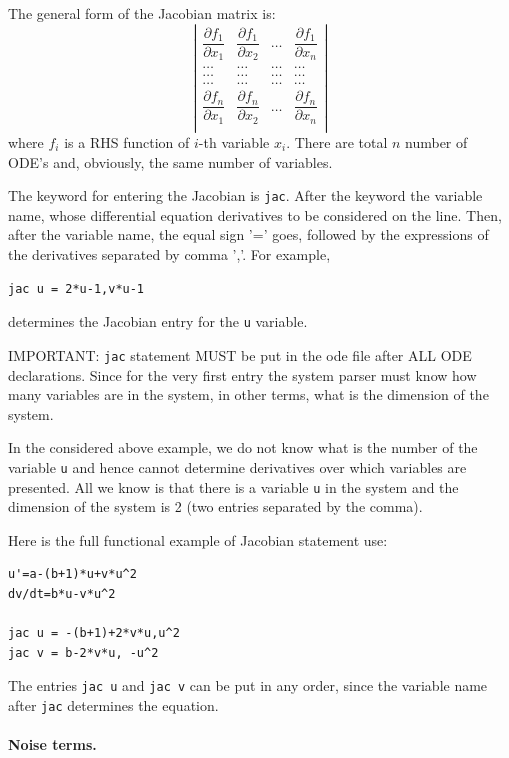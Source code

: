 \documentclass[11pt,a4paper]{article}
\begin{document}
The general form of the Jacobian matrix is:
$$
\left|
  \begin{matrix}
    \dfrac{\partial f_1}{\partial x_1} & \dfrac{\partial f_1}{\partial x_2} & \ldots &
    \dfrac{\partial f_1}{\partial x_n}\\
    \ldots & \ldots & \ldots & \ldots \\
    \ldots & \ldots & \ldots & \ldots \\
    \ldots & \ldots & \ldots & \ldots \\
    \dfrac{\partial f_n}{\partial x_1} & \dfrac{\partial f_n}{\partial x_2} & \ldots &
    \dfrac{\partial f_n}{\partial x_n}\\
  \end{matrix}
\right|
$$
where $f_i$ is a RHS function of $i$-th variable $x_i$. There are total $n$ number of
ODE's and, obviously, the same number of variables.

The keyword for entering the Jacobian is \verb-jac-. After the keyword the variable
name, whose differential equation derivatives to be considered on the line. Then,
after the variable name, the equal sign '=' goes, followed by the expressions of the
derivatives separated by comma ','. For example,
\begin{verbatim}
jac u = 2*u-1,v*u-1
\end{verbatim}
determines the Jacobian entry for the \verb-u- variable.

IMPORTANT: \verb-jac- statement MUST be put in the ode file after ALL ODE
declarations. Since for the very first entry the system parser must know how many
variables are in the system, in other terms, what is the dimension of the system.

In the considered above example, we do not know what is the number of the variable
\verb-u- and hence cannot determine derivatives over which variables are
presented. All we know is that there is a variable \verb-u- in the system and the
dimension of the system is 2 (two entries separated by the comma).

Here is the full functional example of Jacobian statement use:
\begin{verbatim}
u'=a-(b+1)*u+v*u^2
dv/dt=b*u-v*u^2

jac u = -(b+1)+2*v*u,u^2
jac v = b-2*v*u, -u^2
\end{verbatim}
The entries \verb-jac u- and \verb-jac v- can be put in any order, since the
variable name after \verb-jac- determines the equation.

\paragraph{Noise terms.}
\label{sec:noise-terms}
\end{document}
